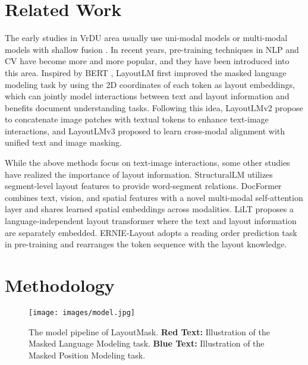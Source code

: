 \documentclass[11pt]{article}
\begin{document}
\section{Related Work}
\label{sec:Related Work}
The early studies in VrDU area usually use uni-modal models or multi-modal models with shallow fusion \citep{yang2016hierarchical,yang2017learning,katti2018chargrid,sarkhel2019deterministic}.
In recent years, pre-training techniques in NLP \citep{kenton2019bert, zhang2019ernie, bao2020unilmv2} and CV \citep{bao2021beit,li2022dit} have become more and more popular, and they have been introduced into this area.
Inspired by BERT \citep{kenton2019bert}, LayoutLM \citep{xu2020layoutlm} first improved the masked language modeling task by using the 2D coordinates of each token as layout embeddings, which can jointly model interactions between text and layout information and benefits document understanding tasks.
Following this idea, LayoutLMv2 \citep{xu2021layoutlmv2} propose to concatenate image patches with textual tokens to enhance text-image interactions, and LayoutLMv3 \citep{huang2022layoutlmv3}  proposed to learn cross-modal alignment with unified text and image masking.

While the above methods focus on text-image interactions, some other studies have realized the importance of layout information.
StructuralLM \citep{li2021structurallm} utilizes segment-level layout features to provide word-segment relations.
DocFormer \citep{appalaraju2021docformer} combines text, vision, and spatial features with a novel multi-modal self-attention layer and shares learned spatial embeddings across modalities.
LiLT \citep{wang2022lilt} proposes a language-independent layout transformer where the text and layout information are separately embedded.
ERNIE-Layout \citep{peng2022ernie} adopts a reading order prediction task in pre-training and rearranges the token sequence with the layout knowledge.


\section{Methodology}

\begin{figure*}[ht]
	\centering
	\texttt{[image: images/model.jpg]}
	\caption{The model pipeline of LayoutMask. \textbf{Red Text:} Illustration of the Masked Language Modeling task. \textbf{Blue Text:} Illustration of the Masked Position Modeling task.}
	\label{fig:model-structure}
\end{figure*}
\end{document}
